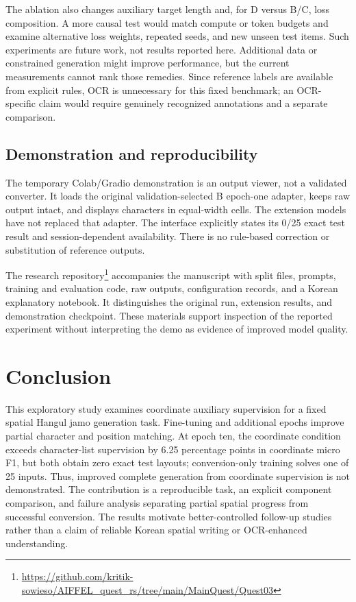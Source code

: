 \documentclass[journal]{IEEEtran}
\begin{document}
The ablation also changes auxiliary target length and, for D versus B/C, loss composition. A more causal test would match compute or token budgets and examine alternative loss weights, repeated seeds, and new unseen test items. Such experiments are future work, not results reported here. Additional data or constrained generation might improve performance, but the current measurements cannot rank those remedies. Since reference labels are available from explicit rules, OCR is unnecessary for this fixed benchmark; an OCR-specific claim would require genuinely recognized annotations and a separate comparison.

\subsection{Demonstration and reproducibility}
The temporary Colab/Gradio demonstration is an output viewer, not a validated converter. It loads the original validation-selected B epoch-one adapter, keeps raw output intact, and displays characters in equal-width cells. The extension models have not replaced that adapter. The interface explicitly states its 0/25 exact test result and session-dependent availability. There is no rule-based correction or substitution of reference outputs.

The research repository\footnote{\url{https://github.com/kritik-sowieso/AIFFEL_quest_rs/tree/main/MainQuest/Quest03}} accompanies the manuscript with split files, prompts, training and evaluation code, raw outputs, configuration records, and a Korean explanatory notebook. It distinguishes the original run, extension results, and demonstration checkpoint. These materials support inspection of the reported experiment without interpreting the demo as evidence of improved model quality.

\section{Conclusion}
This exploratory study examines coordinate auxiliary supervision for a fixed spatial Hangul jamo generation task. Fine-tuning and additional epochs improve partial character and position matching. At epoch ten, the coordinate condition exceeds character-list supervision by 6.25 percentage points in coordinate micro F1, but both obtain zero exact test layouts; conversion-only training solves one of 25 inputs. Thus, improved complete generation from coordinate supervision is not demonstrated. The contribution is a reproducible task, an explicit component comparison, and failure analysis separating partial spatial progress from successful conversion. The results motivate better-controlled follow-up studies rather than a claim of reliable Korean spatial writing or OCR-enhanced understanding.



\end{document}
